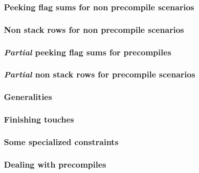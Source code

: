 \subsubsection{Peeking flag sums for non precompile scenarios            \lispDone{}}    \label{hub: instruction handling: call: peeking flag sums for nonn precompiles}    
\subsubsection{Non stack rows for non precompile scenarios               \lispDone{}}    \label{hub: instruction handling: call: non stack rows for non precompiles}        
\subsubsection{\emph{Partial} peeking flag sums for precompiles          \lispDone{}}    \label{hub: instruction handling: call: partial peeking flag sums for precompiles} 
\subsubsection{\emph{Partial} non stack rows for precompile scenarios    \lispDone{}}    \label{hub: instruction handling: call: partial non stack rows for precompiles}    
\subsubsection{Generalities                                              \lispDone{}}    \label{hub: instruction handling: call: generalities}                              
\subsubsection{Finishing touches                                         \lispDone{}}    \label{hub: instruction handling: call: finishing touches}                         
\subsubsection{Some specialized constraints                              \lispDone{}}    \label{hub: instruction handling: call: specialized constraints}                   
\subsubsection{Dealing with precompiles                                  \lispDone{}}    \label{hub: instruction handling: call: precompile memory operations}              
